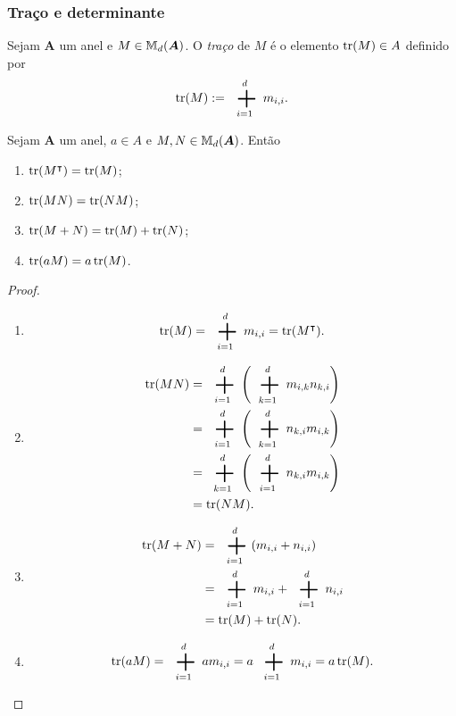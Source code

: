 \subsubsection{Traço e determinante}

\begin{definition}
	Sejam $\bm A$ um anel e $M \in \mathbb{M}_d(\bm A)$. O \emph{traço} de $M$ é o elemento $\operatorname{tr}(M) \in A$ definido por
	\begin{equation*}
	\tr(M) := \sum_{i=1}^d m_{i,i}.
	\end{equation*}
\end{definition}

\begin{proposition}
	Sejam $\bm A$ um anel, $a \in A$ e $M,N \in \mathbb{M}_d(\bm A)$. Então
	\begin{enumerate}
	\item $\operatorname{tr}(M^\intercal)=\operatorname{tr}(M)$;
	\item $\operatorname{tr}(MN)=\operatorname{tr}(NM)$;
	\item $\operatorname{tr}(M+N)=\operatorname{tr}(M)+\operatorname{tr}(N)$;
	\item $\operatorname{tr}(aM)=a\operatorname{tr}(M)$.
	\end{enumerate}
\end{proposition}
\begin{proof}
	\begin{enumerate}
	\item
		\begin{equation*}
		\tr(M) = \sum_{i=1}^d m_{i,i} = \tr(M^\intercal).
		\end{equation*}
	\item
		\begin{align*}
		\tr(MN) &= \sum_{i=1}^d \left(\sum_{k=1}^d m_{i,k}n_{k,i}\right) \\
		&= \sum_{i=1}^d \left(\sum_{k=1}^d n_{k,i}m_{i,k}\right) \\
		&= \sum_{k=1}^d \left(\sum_{i=1}^d n_{k,i}m_{i,k}\right) \\
		&= \tr(NM).
		\end{align*}
	\item
		\begin{align*}
		\tr(M+N) &= \sum_{i=1}^d (m_{i,i} + n_{i,i}) \\
		&= \sum_{i=1}^d m_{i,i} + \sum_{i=1}^d n_{i,i} \\
		&= \tr(M) + \tr(N).
		\end{align*}
	\item
		\begin{equation*}
		\tr(aM) = \sum_{i=1}^d am_{i,i} = a\sum_{i=1}^d m_{i,i} = a\tr(M).
		\end{equation*}
\qedhere
	\end{enumerate}
\end{proof}



